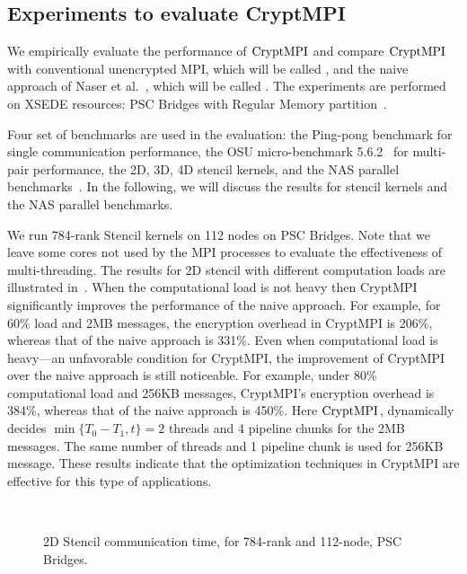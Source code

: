 \subsection{Experiments to evaluate CryptMPI}
\label{sec:eval}

We empirically evaluate the performance of $\textrm{CryptMPI}$ and compare $\textrm{CryptMPI}$ with
conventional unencrypted MPI, which will be called \Unencrypted,
and the naive approach of
Naser et al.~\cite{Cluster:Naser19}, which will be called {\Naive}.
The experiments are performed on XSEDE resources: PSC
Bridges with Regular Memory partition~\cite{XSEDE}.

Four set of benchmarks are used in the evaluation: the Ping-pong benchmark for single
communication performance, the OSU micro-benchmark 5.6.2~\cite{OSUBM} for multi-pair
performance, the 2D, 3D, 4D stencil kernels, and the NAS parallel
benchmarks~\cite{Bailey:1991:NPB:2748645.2748648}.
In the following, we will discuss the results for stencil kernels and the NAS parallel
benchmarks. 

We run 784-rank Stencil kernels on 112 nodes on PSC Bridges. Note that we leave
some cores not used by the MPI processes to evaluate the effectiveness of multi-threading. 
The results for 2D stencil with different computation loads
are illustrated in~.
When the computational load is not heavy then CryptMPI
significantly improves the performance of the naive  approach.
For example, for 60\% load and 2MB messages,
the encryption overhead in CryptMPI is 206\%,
whereas that of the naive approach is 331\%.
Even when computational load is heavy---an unfavorable condition for CryptMPI,
the improvement of CryptMPI over the naive approach is still noticeable.
For example, under 80\% computational load and 256KB messages,
CryptMPI's encryption overhead is 384\%,
whereas that of the naive approach is 450\%. { Here $\textrm{CryptMPI}$,
dynamically decides $\min\{T_0-T_1, t\} = 2$ threads and 4 pipeline chunks for
the 2MB messages. The same number of threads and 1 pipeline chunk is used for 256KB message.
These results indicate that the optimization techniques in CryptMPI
are effective for this type of applications.}

\begin{figure}[!tbp]
\centering
{}
\,
\captionsetup{singlelinecheck=false}
\caption{2D Stencil communication time, for 784-rank and 112-node, PSC Bridges.}
\label{fig:2d_stencil}
\end{figure}


